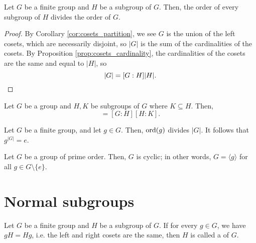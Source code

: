\begin{thm}
Let $ G $ be a finite group and $ H $ be a subgroup of $ G $. Then, the order of every subgroup of $ H $ divides the order of $ G $.
\end{thm}
\begin{proof}
By Corollary \ref{cor:cosets_partition}, we see $ G $ is the union of the left cosets, which are necessarily disjoint, so $ \lvert G\rvert $ is the sum of the cardinalities of the cosets. By Proposition \ref{prop:cosets_cardinality}, the cardinalities of the cosets are the same and equal to $ \lvert H\rvert $, so
\begin{equation*}
    \lvert G\rvert=[G:H]\lvert H\rvert. \qedhere
\end{equation*}
\end{proof}

\begin{cor}
Let $ G $ be a group and $ H,K $ be subgroups of $ G $ where $ K\subseteq H $. Then,
\begin{equation*}
    [G:K]=[G:H][H:K].
\end{equation*}
\end{cor}

\begin{cor}
Let $ G $ be a finite group, and let $ g\in G $. Then, $ \operatorname{ord}(g) $ divides $ \lvert G\rvert $. It follows that $ g^{\lvert G\rvert}=e $.
\end{cor}

\begin{cor}
Let $ G $ be a group of prime order. Then, $ G $ is cyclic; in other words, $ G=\langle g\rangle $ for all $ g\in G\setminus\{e\} $.
\end{cor}

\section{Normal subgroups}

\begin{defn}
Let $ G $ be a finite group and $ H $ be a subgroup of $ G $. If for every $ g\in G $, we have $ gH=Hg $, i.e. the left and right cosets are the same, then $ H $ is called a  of $ G $.
\end{defn}


